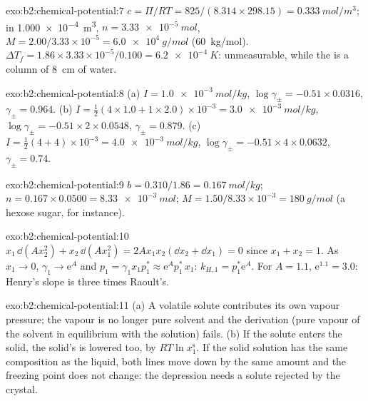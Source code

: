 \begin{solution}{exo:b2:chemical-potential:7}
$c = \Pi/RT = 825/(8.314 \times 298.15) = \qty{0.333}{mol/m^3}$; in
\qty{1.000e-4}{m^3}, $n = \qty{3.33e-5}{mol}$, $M = 2.00/3.33 \times 10^{-5}
= \qty{6.0e4}{g/mol}$ (\qty{60}{kg/mol}). $\Delta T_f = 1.86 \times 3.33
\times 10^{-5}/0.100 = \qty{6.2e-4}{K}$: unmeasurable, while the  is a column of \qty{8}{cm} of water.
\end{solution}

\begin{solution}{exo:b2:chemical-potential:8}
(a) $I = \qty{1.0e-3}{mol/kg}$, $\log\gamma_\pm = -0.51 \times 0.0316$,
$\gamma_\pm = 0.964$. (b) $I = \frac12(4 \times 1.0 + 1 \times 2.0) \times
10^{-3} = \qty{3.0e-3}{mol/kg}$, $\log\gamma_\pm = -0.51 \times 2 \times 0.0548$,
$\gamma_\pm = 0.879$. (c) $I = \frac12(4 + 4) \times 10^{-3} = \qty{4.0e-3}{mol/kg}$,
$\log\gamma_\pm = -0.51 \times 4 \times 0.0632$, $\gamma_\pm = 0.74$.
\end{solution}

\begin{solution}{exo:b2:chemical-potential:9}
$b = 0.310/1.86 = \qty{0.167}{mol/kg}$; $n = 0.167 \times 0.0500 =
\qty{8.33e-3}{mol}$; $M = 1.50/8.33 \times 10^{-3} = \qty{180}{g/mol}$ (a
hexose sugar, for instance).
\end{solution}

\begin{solution}{exo:b2:chemical-potential:10}
$x_1\,\dd(Ax_2^2) + x_2\,\dd(Ax_1^2) = 2Ax_1x_2(\dd x_2 + \dd x_1) = 0$ since
$x_1 + x_2 = 1$. As $x_1 \to 0$, $\gamma_1 \to \mathrm e^{A}$ and $p_1 =
\gamma_1x_1p_1^* \approx \mathrm e^{A}p_1^*\,x_1$: $k_{H,1} = p_1^*\mathrm e^A$.
For $A = 1.1$, $\mathrm e^{1.1} = 3.0$: Henry's slope is three times Raoult's.
\end{solution}

\begin{solution}{exo:b2:chemical-potential:11}
(a) A volatile solute contributes its own vapour pressure; the vapour is no
longer pure solvent and the derivation (pure vapour of the solvent in
equilibrium with the solution) fails. (b) If the solute enters the solid, the
solid's  is lowered too, by $RT\ln x_1^{\text{s}}$. If the
solid solution has the same composition as the liquid, both lines move down
by the same amount and the freezing point does not change: the depression
needs a solute rejected by the crystal.
\end{solution}

